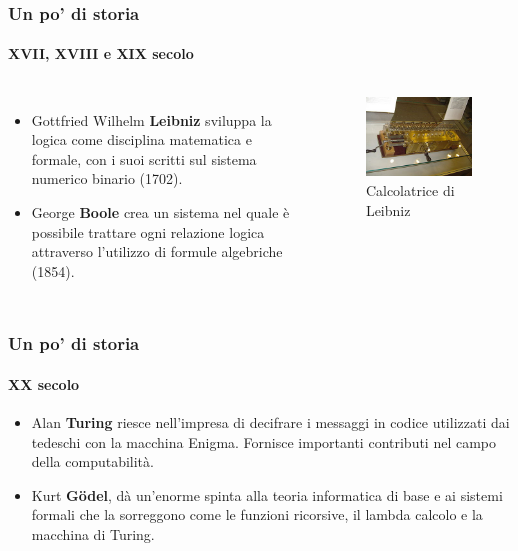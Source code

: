 \documentclass[11pt]{beamer}
\begin{document}
    \begin{frame}
        \frametitle{Un po' di storia}
        \framesubtitle{XVII, XVIII e XIX secolo}
        
        \begin{columns}
            \begin{itemize}
                \item Gottfried Wilhelm \textbf{Leibniz} sviluppa la logica come disciplina matematica e formale, con i suoi scritti sul \alert{sistema numerico binario} (1702).
                
                \item George \textbf{Boole} crea un sistema nel quale è possibile trattare ogni relazione logica attraverso l'utilizzo di \alert{formule algebriche} (1854).
            \end{itemize}
            
            \begin{figure}
                \includegraphics[scale=0.4]{img/calcolatrice-leibniz.jpg}
                \caption{Calcolatrice di Leibniz}
            \end{figure}
        \end{columns}
    \end{frame}

    \begin{frame}
        \frametitle{Un po' di storia}
        \framesubtitle{XX secolo}
        
        \begin{itemize}
            \item Alan \textbf{Turing} riesce nell'impresa di decifrare i messaggi in codice utilizzati dai tedeschi con la macchina Enigma. Fornisce importanti contributi nel campo della \alert{computabilità}.
            
            \item Kurt \textbf{Gödel}, dà un'enorme spinta alla teoria informatica di base e ai sistemi formali che la sorreggono come le \alert{funzioni ricorsive}, il \alert{lambda calcolo} e la \alert{macchina di Turing}.
        \end{itemize}
    \end{frame}
\end{document}

